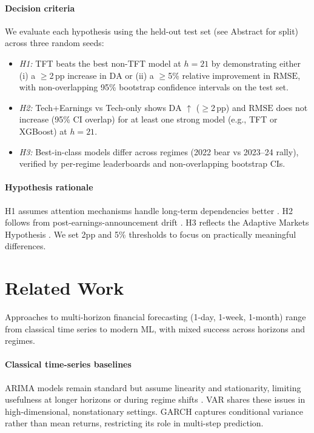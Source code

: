 \documentclass[conference,a4paper]{IEEEtran}
\newcommand{\rmse}{\ensuremath{\mathrm{RMSE}}}
\newcommand{\da}{\ensuremath{\mathrm{DA}}}
\begin{document}
\paragraph{Decision criteria}
We evaluate each hypothesis using the held-out test set (see Abstract for split) across three random seeds:
\begin{itemize}
        \item \textit{H1:} TFT beats the best non-TFT model at $h{=}21$ by demonstrating either (i) a $\geq$2\,pp increase in \da{} or (ii) a $\geq$5\% relative improvement in \rmse{}, with non-overlapping 95\% bootstrap confidence intervals on the test set.
    \item \textit{H2:} Tech{+}Earnings vs Tech-only shows \da{} $\uparrow$ ($\geq$2\,pp) and \rmse{} does not increase (95\% CI overlap) for at least one strong model (e.g., TFT or XGBoost) at $h{=}21$.
  \item \textit{H3:} Best-in-class models differ across regimes (2022 bear vs 2023--24 rally), verified by per-regime leaderboards and non-overlapping bootstrap CIs.
\end{itemize}

\paragraph{Hypothesis rationale}
H1 assumes attention mechanisms handle long-term dependencies better \citep{lim2021temporal}. H2 follows from post-earnings-announcement drift \citep{bernard1989,schnaubelt2020}. H3 reflects the Adaptive Markets Hypothesis \citep{lo2004}. We set 2pp and 5\% thresholds to focus on practically meaningful differences.



\section{Related Work}
Approaches to multi-horizon financial forecasting (1-day, 1-week, 1-month) range from classical time series to modern ML, with mixed success across horizons and regimes.

\paragraph{Classical time-series baselines} ARIMA models remain standard but assume linearity and stationarity, limiting usefulness at longer horizons or during regime shifts \citep{box2015}. VAR shares these issues in high-dimensional, nonstationary settings. GARCH captures conditional variance rather than mean returns, restricting its role in multi-step prediction.
\end{document}
